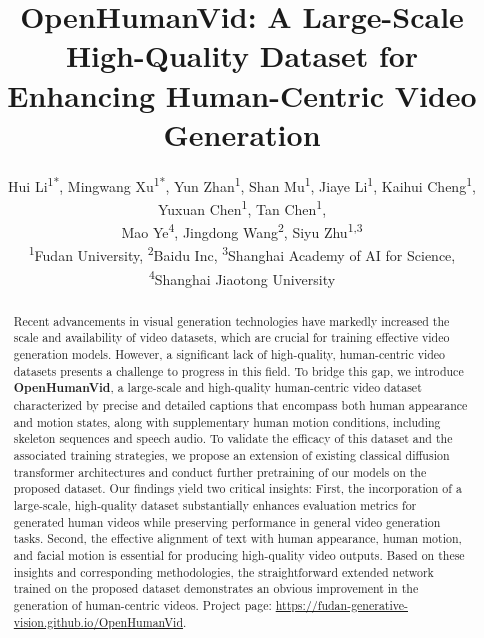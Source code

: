 \documentclass[10pt,twocolumn,letterpaper]{article}
\begin{document}
\title{OpenHumanVid: A Large-Scale High-Quality Dataset for Enhancing Human-Centric Video Generation}

\author{Hui Li\textsuperscript{1*},
        Mingwang Xu\textsuperscript{1*},
        Yun Zhan\textsuperscript{1},
        Shan Mu\textsuperscript{1},
        Jiaye Li\textsuperscript{1},
        Kaihui Cheng\textsuperscript{1},
        Yuxuan Chen\textsuperscript{1},
        Tan Chen\textsuperscript{1},\\
        Mao Ye\textsuperscript{4},
        Jingdong Wang\textsuperscript{2},
        Siyu Zhu\textsuperscript{1,3} \\
\textsuperscript{1}Fudan University, 
\textsuperscript{2}Baidu Inc, 
\textsuperscript{3}Shanghai Academy of AI for Science, \\
\textsuperscript{4}Shanghai Jiaotong University
\\
}
\maketitle

\renewcommand{\thefootnote}{\fnsymbol{footnote}}
\renewcommand{\thefootnote}{\arabic{footnote}}


\begin{abstract}
Recent advancements in visual generation technologies have markedly increased the scale and availability of video datasets, which are crucial for training effective video generation models. 
However, a significant lack of high-quality, human-centric video datasets presents a challenge to progress in this field. 
To bridge this gap, we introduce \textbf{OpenHumanVid}, a large-scale and high-quality human-centric video dataset characterized by precise and detailed captions that encompass both human appearance and motion states, along with supplementary human motion conditions, including skeleton sequences and speech audio.
To validate the efficacy of this dataset and the associated training strategies, we propose an extension of existing classical diffusion transformer architectures and conduct further pretraining of our models on the proposed dataset. 
Our findings yield two critical insights: First, the incorporation of a large-scale, high-quality dataset substantially enhances evaluation metrics for generated human videos while preserving performance in general video generation tasks. 
Second, the effective alignment of text with human appearance, human motion, and facial motion is essential for producing high-quality video outputs.
Based on these insights and corresponding methodologies, the straightforward extended network trained on the proposed dataset demonstrates an obvious improvement in the generation of human-centric videos. Project
page: \href{https://fudan-generative-vision.github.io/OpenHumanVid}{https://fudan-generative-vision.github.io/OpenHumanVid}.
\vspace{-4mm}
\end{abstract}
\end{document}
